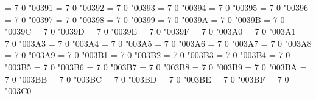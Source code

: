 \def\not#1{%
  \ifx#1=\mathrel{\char"02260}\else %
  \mathrel{\mathpalette\c@ncel{#1}}\fi %
}
\def\c@ncel#1#2{%
  \m@th
  \setbox0=\hbox{$#1#2$}%
  \rlap{\hbox to\wd0{\hss$#1/$\hss}}%
  \box0%
}
\Umathchardef\mupAlpha = 7 0 "00391 %
\Umathchardef\mupBeta = 7 0 "00392 %
\Umathchardef\mupGamma = 7 0 "00393 %
\Umathchardef\mupDelta = 7 0 "00394 %
\Umathchardef\mupEpsilon = 7 0 "00395 %
\Umathchardef\mupZeta = 7 0 "00396 %
\Umathchardef\mupEta = 7 0 "00397 %
\Umathchardef\mupTheta = 7 0 "00398 %
\Umathchardef\mupIota = 7 0 "00399 %
\Umathchardef\mupKappa = 7 0 "0039A %
\Umathchardef\mupLambda = 7 0 "0039B %
\Umathchardef\mupMu = 7 0 "0039C %
\Umathchardef\mupNu = 7 0 "0039D %
\Umathchardef\mupXi = 7 0 "0039E %
\Umathchardef\mupOmicron = 7 0 "0039F %
\Umathchardef\mupPi = 7 0 "003A0 %
\Umathchardef\mupRho = 7 0 "003A1 %
\Umathchardef\mupSigma = 7 0 "003A3 %
\Umathchardef\mupTau = 7 0 "003A4 %
\Umathchardef\mupUpsilon = 7 0 "003A5 %
\Umathchardef\mupPhi = 7 0 "003A6 %
\Umathchardef\mupChi = 7 0 "003A7 %
\Umathchardef\mupPsi = 7 0 "003A8 %
\Umathchardef\mupOmega = 7 0 "003A9 %
\Umathchardef\mupalpha = 7 0 "003B1 %
\Umathchardef\mupbeta = 7 0 "003B2 %
\Umathchardef\mupgamma = 7 0 "003B3 %
\Umathchardef\mupdelta = 7 0 "003B4 %
\Umathchardef\mupvarepsilon = 7 0 "003B5 %
\Umathchardef\mupzeta = 7 0 "003B6 %
\Umathchardef\mupeta = 7 0 "003B7 %
\Umathchardef\muptheta = 7 0 "003B8 %
\Umathchardef\mupiota = 7 0 "003B9 %
\Umathchardef\mupkappa = 7 0 "003BA %
\Umathchardef\muplambda = 7 0 "003BB %
\Umathchardef\mupmu = 7 0 "003BC %
\Umathchardef\mupnu = 7 0 "003BD %
\Umathchardef\mupxi = 7 0 "003BE %
\Umathchardef\mupomicron = 7 0 "003BF %
\Umathchardef\muppi = 7 0 "003C0 %
